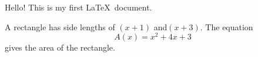 \documentclass[11pt]{article}
\begin{document}
Hello! This is my first \LaTeX\ document.

A rectangle has side lengths of $(x+1)$ and$(x+3)$.
The equation $${A(x)=x^2+4x+3}$$ gives the area of the rectangle.
\end{document}
